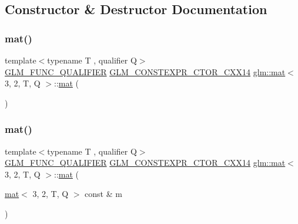 \subsection{Constructor \& Destructor Documentation}
\mbox{\label{structglm_1_1mat_3_013_00_012_00_01_t_00_01_q_01_4_a20c83ce0aec4f293bfb3923b465fe495}} 
\subsubsection{\texorpdfstring{mat()}{mat()}\hspace{0.1cm}{\footnotesize\ttfamily [1/21]}}
{\footnotesize\ttfamily template$<$typename T , qualifier Q$>$ \\
\mbox{\hyperlink{setup_8hpp_a33fdea6f91c5f834105f7415e2a64407}{G\+L\+M\+\_\+\+F\+U\+N\+C\+\_\+\+Q\+U\+A\+L\+I\+F\+I\+ER}} \mbox{\hyperlink{setup_8hpp_a0900f9145e68bf6061b6f5e7be3fa751}{G\+L\+M\+\_\+\+C\+O\+N\+S\+T\+E\+X\+P\+R\+\_\+\+C\+T\+O\+R\+\_\+\+C\+X\+X14}} \mbox{\hyperlink{structglm_1_1mat}{glm\+::mat}}$<$ 3, 2, T, Q $>$\+::\mbox{\hyperlink{structglm_1_1mat}{mat}} (\begin{DoxyParamCaption}{ }\end{DoxyParamCaption})}

\mbox{\label{structglm_1_1mat_3_013_00_012_00_01_t_00_01_q_01_4_aae7ec73b0747140723ff9678e024ad52}} 
\subsubsection{\texorpdfstring{mat()}{mat()}\hspace{0.1cm}{\footnotesize\ttfamily [2/21]}}
{\footnotesize\ttfamily template$<$typename T , qualifier Q$>$ \\
\mbox{\hyperlink{setup_8hpp_a33fdea6f91c5f834105f7415e2a64407}{G\+L\+M\+\_\+\+F\+U\+N\+C\+\_\+\+Q\+U\+A\+L\+I\+F\+I\+ER}} \mbox{\hyperlink{setup_8hpp_a0900f9145e68bf6061b6f5e7be3fa751}{G\+L\+M\+\_\+\+C\+O\+N\+S\+T\+E\+X\+P\+R\+\_\+\+C\+T\+O\+R\+\_\+\+C\+X\+X14}} \mbox{\hyperlink{structglm_1_1mat}{glm\+::mat}}$<$ 3, 2, T, Q $>$\+::\mbox{\hyperlink{structglm_1_1mat}{mat}} (\begin{DoxyParamCaption}\item[{\mbox{\hyperlink{structglm_1_1mat}{mat}}$<$ 3, 2, T, Q $>$ const \&}]{m }\end{DoxyParamCaption})}

